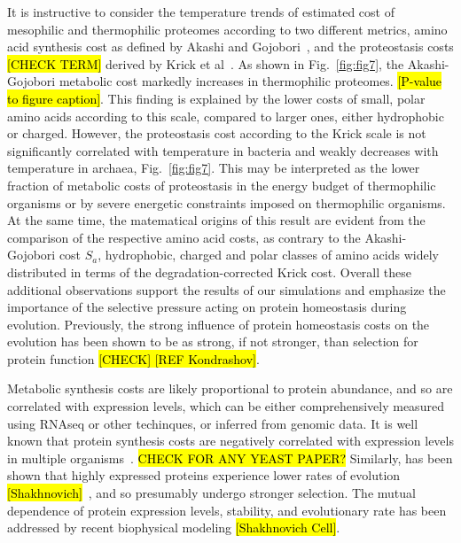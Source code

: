 \documentclass[10pt,letterpaper]{article}
\begin{document}
It is instructive to consider the temperature trends of estimated cost of mesophilic and thermophilic proteomes according to two different metrics, amino acid synthesis cost as defined by Akashi and Gojobori~\cite{Akashi2002Metabolic}, and the proteostasis costs \hl{[CHECK TERM]} derived by Krick et al~\cite{Krick2014Amino}. As shown in Fig.~\ref{fig:fig7}, the Akashi-Gojobori metabolic cost markedly increases in thermophilic proteomes. \hl{[P-value to figure caption]}. This finding is explained by the lower costs of small, polar amino acids according to this scale, compared to larger ones, either hydrophobic or charged. However, the proteostasis cost according to the Krick scale is not significantly correlated with temperature in bacteria and weakly decreases with temperature in archaea, Fig.~\ref{fig:fig7}.  This may be interpreted as the lower fraction of metabolic costs  of proteostasis in the energy budget of thermophilic organisms or by severe energetic constraints imposed on thermophilic organisms. At the same time, the matematical origins of this result are evident from the comparison of the respective amino acid costs, as contrary to the Akashi-Gojobori cost $S_{a}$, hydrophobic, charged and polar classes of amino acids widely distributed in terms of the degradation-corrected Krick cost. Overall these additional observations support the results of our simulations and emphasize the importance of the selective pressure acting on protein homeostasis during evolution. Previously, the strong influence of protein homeostasis costs on the evolution has been shown to be as strong, if not stronger, than selection for protein function \hl{[CHECK] [REF Kondrashov]}.

Metabolic synthesis costs are likely proportional to protein abundance, and so are correlated with expression levels, which can be either comprehensively measured using RNAseq or other techinques, or inferred from genomic data. It is well known that protein synthesis costs are negatively correlated with expression levels in multiple organisms~\cite{Akashi2002Metabolic,Seligmann2003CostMinimization,Heizer2006Amino}. \hl{CHECK FOR ANY YEAST PAPER?} Similarly, has been shown that highly expressed proteins experience lower rates of evolution \hl{[Shakhnovich]}~\cite{Drummond2008MistranslationInduced}, and so presumably undergo stronger selection. The mutual dependence of protein expression levels, stability, and evolutionary rate has been addressed by recent biophysical modeling \hl{[Shakhnovich Cell]}.
\end{document}
